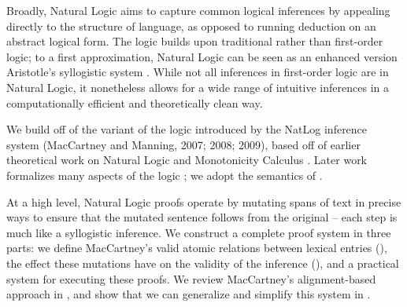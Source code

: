 Broadly, Natural Logic aims to capture common logical
  inferences by appealing directly to the structure of language,
  as opposed to running deduction on an abstract logical form.
The logic builds upon traditional rather than first-order logic;
  to a first approximation, Natural Logic can be seen as
  an enhanced version Aristotle's syllogistic system
  \cite{key:2008vanbenthem-natlog}.
While not all inferences in first-order logic are in Natural Logic,
  it nonetheless allows for a wide range of intuitive inferences in
  a computationally efficient and theoretically clean way.

We build off of the variant of the logic introduced by
  the NatLog inference system (MacCartney and Manning, 2007; 2008; 2009),
  \nocite{key:2007maccartney-natlog}
  \nocite{key:2008maccartney-natlog}
  \nocite{key:2009maccartney-natlog}
  based off of earlier theoretical work on Natural Logic and 
  Monotonicity Calculus
  \cite{key:1986benthem-natlog,key:1991valencia-natlog}.
Later work formalizes many aspects of the logic
  \cite{key:2012icard-natlog,key:2013djalali-natlog};
  we adopt the semantics of
  .

At a high level, Natural Logic proofs operate by mutating spans of text
  in precise ways to ensure that the mutated sentence follows from the
  original -- each step is much like a syllogistic inference.
We construct a complete proof system in three parts:
  we define MacCartney's valid atomic relations between lexical entries
  (), the effect these mutations have
  on the validity of the inference (),
  and a practical system for executing these proofs.
We review MacCartney's alignment-based approach in
  , and show that we can generalize and
  simplify this system in .

